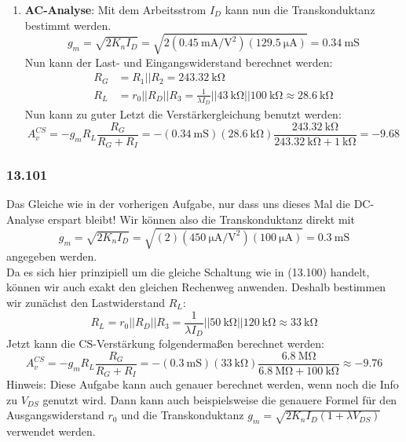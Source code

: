 \documentclass[11pt,a4paper,titlepage]{article}
\begin{document}
\begin{enumerate}
	\item \textbf{AC-Analyse}: Mit dem Arbeitsstrom $I_D$ kann nun die Transkonduktanz bestimmt werden.
	\[ g_m=\sqrt{2K_nI_D} = \sqrt{2(\SI{0.45}{\milli\ampere\per\square\volt})(\SI{129.5}{\micro\ampere})} = \SI{0.34}{\milli\siemens} \]
	Nun kann der Last- und Eingangswiderstand berechnet werden:
	\begin{equation}
	\begin{aligned}
	R_G &= R_1||R_2 = \SI{243.32}{\kilo\ohm}\\
	R_L &= r_0||R_D||R_3 = \frac{1}{\lambda I_D} || \SI{43}{\kilo\ohm} || \SI{100}{\kilo\ohm} \approx \SI{28.6}{\kilo\ohm}
	\end{aligned}
	\end{equation}
	Nun kann zu guter Letzt die Verstärkergleichung benutzt werden:
	\[ A_v^{CS} = -g_mR_L\frac{R_G}{R_G+R_I} = -(\SI{0.34}{\milli\siemens})(\SI{28.6}{\kilo\ohm}) \frac{\SI{243.32}{\kilo\ohm}}{\SI{243.32}{\kilo\ohm} + \SI{1}{\kilo\ohm}} = -9.68 \]
	
\end{enumerate}

\subsubsection*{13.101}
Das Gleiche wie in der vorherigen Aufgabe, nur dass uns dieses Mal die DC-Analyse erspart bleibt! Wir können also die Transkonduktanz direkt mit
\[ g_m = \sqrt{2K_nI_D} = \sqrt{(2)(\SI{450}{\micro\ampere\per\square\volt})(\SI{100}{\micro\ampere})} = \SI{0.3}{\milli\siemens} \] 
angegeben werden.\\
Da es sich hier prinzipiell um die gleiche Schaltung wie in (13.100) handelt, können wir auch exakt den gleichen Rechenweg anwenden. Deshalb bestimmen wir zunächst den Lastwiderstand $R_L$:
\[ R_L = r_0||R_D||R_3 = \frac{1}{\lambda I_D} || \SI{50}{\kilo\ohm} || \SI{120}{\kilo\ohm} \approx \SI{33}{\kilo\ohm} \]
Jetzt kann die CS-Verstärkung folgendermaßen berechnet werden:
\[ A_v^{CS} = -g_mR_L\frac{R_G}{R_G+R_I} = -(\SI{0.3}{\milli\siemens})(\SI{33}{\kilo\ohm}) \frac{\SI{6.8}{\mega\ohm}}{\SI{6.8}{\mega\ohm} + \SI{100}{\kilo\ohm}} \approx - 9.76\]
Hinweis: Diese Aufgabe kann auch genauer berechnet werden, wenn noch die Info zu $V_{DS}$ genutzt wird. Dann kann auch beispielsweise die genauere Formel für den Ausgangswiderstand $r_0$ und die Transkonduktanz $g_m = \sqrt{2K_nI_D(1+\lambda V_{DS})}$ verwendet werden.
\end{document}
